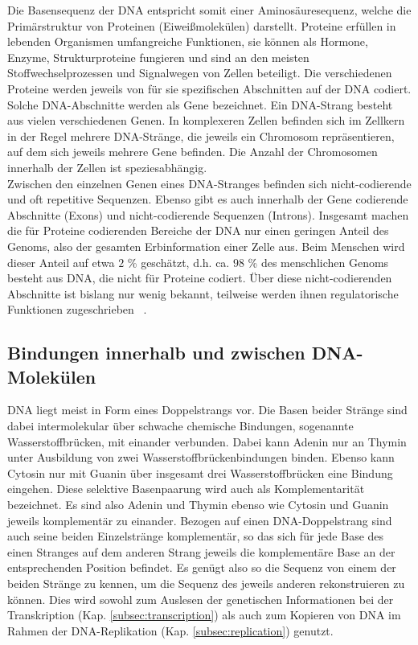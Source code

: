 Die Basensequenz der DNA entspricht somit einer Aminosäuresequenz, welche die Primärstruktur von Proteinen (Eiweißmolekülen) darstellt. Proteine erfüllen in lebenden Organismen umfangreiche Funktionen, sie können als Hormone, Enzyme, Strukturproteine fungieren und sind an den meisten Stoffwechselprozessen und Signalwegen von Zellen beteiligt. Die verschiedenen Proteine werden jeweils von für sie spezifischen Abschnitten auf der DNA codiert. Solche DNA-Abschnitte werden als Gene bezeichnet. Ein DNA-Strang besteht aus vielen verschiedenen Genen. In komplexeren Zellen befinden sich im Zellkern in der Regel mehrere DNA-Stränge, die jeweils ein Chromosom repräsentieren, auf dem sich jeweils mehrere Gene befinden. Die Anzahl der Chromosomen innerhalb der Zellen ist speziesabhängig. \\

Zwischen den einzelnen Genen eines DNA-Stranges befinden sich nicht-codierende und oft repetitive Sequenzen. Ebenso gibt es auch innerhalb der Gene codierende Abschnitte (Exons) und nicht-codierende Sequenzen (Introns). Insgesamt machen die für Proteine codierenden Bereiche der DNA nur einen geringen Anteil des Genoms, also der gesamten Erbinformation einer Zelle aus. Beim Menschen wird dieser Anteil auf etwa $2$ \% geschätzt, d.h. ca. $ 98 $ \% des menschlichen Genoms besteht aus DNA, die nicht für Proteine codiert. Über diese nicht-codierenden Abschnitte ist bislang nur wenig bekannt, teilweise werden ihnen regulatorische Funktionen zugeschrieben ~\cite{dunham_2012, tsagakis_2020}. \\

\subsection{Bindungen innerhalb und zwischen DNA-Molekülen} \label{subsec:double_strand}

DNA liegt meist in Form eines Doppelstrangs vor. Die Basen beider Stränge sind dabei intermolekular über schwache chemische Bindungen, sogenannte Wasserstoffbrücken, mit einander verbunden. Dabei kann Adenin nur an Thymin unter Ausbildung von zwei Wasserstoffbrückenbindungen binden. Ebenso kann Cytosin nur mit Guanin über insgesamt drei Wasserstoffbrücken eine Bindung eingehen. Diese selektive Basenpaarung wird auch als Komplementarität bezeichnet. Es sind also Adenin und Thymin ebenso wie Cytosin und Guanin jeweils komplementär zu einander. Bezogen auf einen DNA-Doppelstrang sind auch seine beiden Einzelstränge komplementär, so das sich für jede Base des einen Stranges auf dem anderen Strang jeweils die komplementäre Base an der entsprechenden Position befindet. Es genügt also so die Sequenz von einem der beiden Stränge zu kennen, um die Sequenz des jeweils anderen rekonstruieren zu können. Dies wird sowohl zum Auslesen der genetischen Informationen bei der Transkription (Kap. \ref{subsec:transcription}) als auch zum Kopieren von DNA im Rahmen der DNA-Replikation (Kap. \ref{subsec:replication}) genutzt. \\

